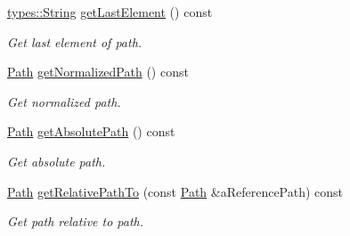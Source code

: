 \begin{DoxyCompactItemize}
\hyperlink{classlibrary_1_1core_1_1types_1_1String}{types\+::\+String} \hyperlink{classlibrary_1_1core_1_1fs_1_1Path_a3e29def9459dd51f1c359435aae4ead1}{get\+Last\+Element} () const
\begin{DoxyCompactList}\small\item\em Get last element of path. \end{DoxyCompactList}\item 
\hyperlink{classlibrary_1_1core_1_1fs_1_1Path}{Path} \hyperlink{classlibrary_1_1core_1_1fs_1_1Path_a920b1d062cb1274da811150afafba124}{get\+Normalized\+Path} () const
\begin{DoxyCompactList}\small\item\em Get normalized path. \end{DoxyCompactList}\item 
\hyperlink{classlibrary_1_1core_1_1fs_1_1Path}{Path} \hyperlink{classlibrary_1_1core_1_1fs_1_1Path_a09dc880115d1e0a9079ac8e106e82c92}{get\+Absolute\+Path} () const
\begin{DoxyCompactList}\small\item\em Get absolute path. \end{DoxyCompactList}\item 
\hyperlink{classlibrary_1_1core_1_1fs_1_1Path}{Path} \hyperlink{classlibrary_1_1core_1_1fs_1_1Path_a8f24340e887cfbfe675e96c0ba92321f}{get\+Relative\+Path\+To} (const \hyperlink{classlibrary_1_1core_1_1fs_1_1Path}{Path} \&a\+Reference\+Path) const
\begin{DoxyCompactList}\small\item\em Get path relative to path. \end{DoxyCompactList}\end{DoxyCompactItemize}
